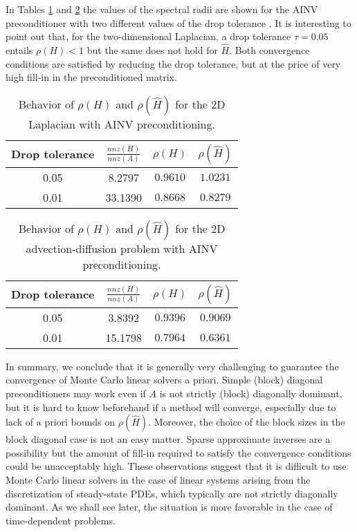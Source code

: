 \documentclass[final,leqno,onefignum,onetabnum]{siamltex1213}
\begin{document}
In Tables \ref{tab:lap2d_ainv} and \ref{tab:ifiss_ainv} the values of
the spectral radii are shown for the AINV
preconditioner with two different values of the drop tolerance
\cite{BMT1996,BT1998}. It is interesting to point out that, for the
two-dimensional
Laplacian, a drop tolerance $\tau=0.05$ entails $\rho(H)<1$ but the same does
not hold for $\hat{H}$. Both convergence conditions are satisfied by
reducing the drop tolerance, but at the price of very high fill-in in the
preconditioned matrix.


\begin{table}[!t]
\centering
\begin{tabular}{|c|c|c|c|}
\hline
\textbf{Drop tolerance} & \textbf{$\frac{nnz(H)}{nnz(A)}$}& $\rho(H)$
&$\rho(\hat{H})$\\
\hline
 0.05 & 8.2797 & $0.9610$ & $1.0231$\\
\hline
 0.01 & 33.1390 & $0.8668$ & $0.8279$\\
\hline
\end{tabular}
\caption{Behavior of $\rho(H)$ and $\rho(\hat{H})$ for the 
2D Laplacian with AINV preconditioning.}
\label{tab:lap2d_ainv}
\end{table}

\begin{table}[!t]
\centering
\begin{tabular}{|c|c|c|c|}
\hline
\textbf{Drop tolerance} & \textbf{$\frac{nnz(H)}{nnz(A)}$}& $\rho(H)$
&$\rho(\hat{H})$\\
\hline
 0.05 & 3.8392 & $0.9396$ & $0.9069$\\
\hline
 0.01 & 15.1798 & $0.7964$ & $0.6361$\\
\hline
\end{tabular}
\caption{Behavior of $\rho(H)$ and $\rho(\hat{H})$ for the 2D 
advection-diffusion problem with AINV preconditioning.}
\label{tab:ifiss_ainv}
\end{table}

In summary, we conclude that it is generally very challenging to guarantee 
the convergence of Monte Carlo linear solvers a priori. Simple (block) diagonal 
preconditioners may work even if $A$ is not strictly (block)
diagonally dominant, but it is hard to know beforehand if a method will converge,
especially due to lack of a priori bounds on $\rho(\hat{H})$.
Moreover, the choice of the block sizes in the block diagonal case
is not an easy matter. Sparse approximate inverses are a possibility
but the amount of fill-in required to satisfy the
convergence conditions could be unacceptably high. These observations
suggest that it is difficult to use Monte Carlo linear solvers in the
case of linear systems arising from the discretization of steady-state
PDEs, which typically are not strictly diagonally dominant.
As we shall see later, the situation is more favorable in the case of
time-dependent problems.
\end{document}
